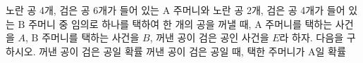 노란 공 4개, 검은 공 6개가 들어 있는 $\mathrm{A}$ 주머니와 노란 공 2개, 검은 공 4개가 들어 있는 $\mathrm{B}$ 주머니 중 임의로 하나를 택하여 한 개의 공을 꺼낼 때, $\mathrm{A}$ 주머니를 택하는 사건을 $A$, $\mathrm{B}$ 주머니를 택하는 사건을 $B$, 꺼낸 공이 검은 공인 사건을 $E$라 하자. 다음을 구하시오.
 꺼낸 공이 검은 공일 확률
 꺼낸 공이 검은 공일 때, 택한 주머니가 $\mathrm{A}$일 확률
